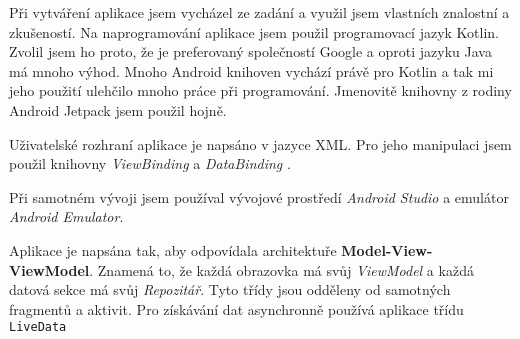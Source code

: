 \documentclass[../TakeYourPill.tex]{subfiles}
\begin{document}
Při vytváření aplikace jsem vycházel ze zadání a využil jsem vlastních znalostní a zkušeností. Na naprogramování aplikace jsem použil programovací jazyk Kotlin. Zvolil jsem ho proto, že je preferovaný společností Google a oproti jazyku Java má mnoho výhod. Mnoho Android knihoven vychází právě pro Kotlin a tak mi jeho použití ulehčilo mnoho práce při programování. Jmenovitě knihovny z rodiny Android Jetpack \cite{jetpack} jsem použil hojně.

Uživatelské rozhraní aplikace je napsáno v jazyce XML. Pro jeho manipulaci jsem použil knihovny \textit{ViewBinding} \cite{viewbinding} a \textit{DataBinding} \cite{databinding}.

Při samotném vývoji jsem používal vývojové prostředí \textit{Android Studio} \cite{studio} a emulátor \textit{Android Emulator}.

Aplikace je napsána tak, aby odpovídala architektuře \textbf{Model-View-ViewModel}. Znamená to, že každá obrazovka má svůj \textit{ViewModel} a každá datová sekce má svůj \textit{Repozitář}. Tyto třídy jsou odděleny od samotných fragmentů a aktivit. Pro získávání dat asynchronně používá aplikace třídu \texttt{LiveData} \cite{livedata}




\end{document}
